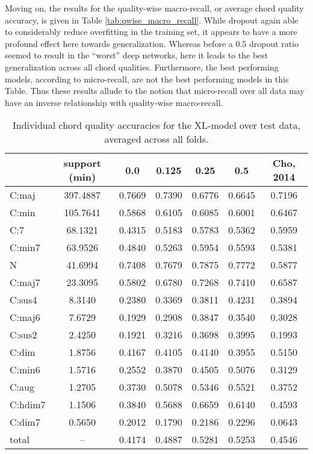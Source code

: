 Moving on, the results for the quality-wise macro-recall, or average chord quality accuracy, is given in Table \ref{tab:qwise_macro_recall}.
While dropout again able to considerably reduce overfitting in the training set, it appears to have a more profound effect here towards generalization.
Whereas before a 0.5 dropout ratio seemed to result in the ``worst'' deep networks, here it leads to the best generalization across all chord qualities.
Furthermore, the best performing models, according to micro-recall, are not the best performing models in this Table.
Thus these results allude to the notion that micro-recall over all data may have an inverse relationship with quality-wise macro-recall.


\begin{table}[t]
\begin{center}
\scriptsize
\caption{Individual chord quality accuracies for the XL-model over test data, averaged across all folds.}
\label{tab:ind_qwise_macro}
\begin{tabular}{l|ccccc|c}
\hline
    &   support (min) &    0.0 &   0.125 &   0.25 &    0.5 & Cho, 2014\\
\hline
 C:maj     &  397.4887 & 0.7669 &  0.7390 & 0.6776 & 0.6645 & 0.7196\\
 C:min     &  105.7641 & 0.5868 &  0.6105 & 0.6085 & 0.6001 & 0.6467\\
 C:7       &   68.1321 & 0.4315 &  0.5183 & 0.5783 & 0.5362 & 0.5959\\
 C:min7    &   63.9526 & 0.4840 &  0.5263 & 0.5954 & 0.5593 & 0.5381\\
 N         &   41.6994 & 0.7408 &  0.7679 & 0.7875 & 0.7772 & 0.5877\\
 C:maj7    &   23.3095 & 0.5802 &  0.6780 & 0.7268 & 0.7410 & 0.6587\\
 \hline
 C:sus4    &    8.3140 & 0.2380 &  0.3369 & 0.3811 & 0.4231 & 0.3894\\
 C:maj6    &    7.6729 & 0.1929 &  0.2908 & 0.3847 & 0.3540 & 0.3028\\
 C:sus2    &    2.4250 & 0.1921 &  0.3216 & 0.3698 & 0.3995 & 0.1993\\
 C:dim     &    1.8756 & 0.4167 &  0.4105 & 0.4140 & 0.3955 & 0.5150\\
 C:min6    &    1.5716 & 0.2552 &  0.3870 & 0.4505 & 0.5076 & 0.3129\\
 C:aug     &    1.2705 & 0.3730 &  0.5078 & 0.5346 & 0.5521 & 0.3752\\
 C:hdim7   &    1.1506 & 0.3840 &  0.5688 & 0.6659 & 0.6140 & 0.4593\\
 C:dim7    &    0.5650 & 0.2012 &  0.1790 & 0.2186 & 0.2296 & 0.0643\\
 \hline
 total & -- & 0.4174 &  0.4887 & 0.5281 & 0.5253 & 0.4546 \\
\hline
\end{tabular}
\end{center}
\end{table}

